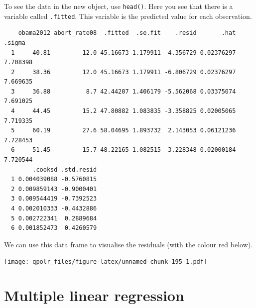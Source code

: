 \documentclass[12pt,oneside]{reedthesis}
\theoremstyle{definition}
\theoremstyle{definition}
\theoremstyle{definition}
\theoremstyle{remark}
\begin{document}
  To see the data in the new object, use \texttt{head()}. Here you see
  that there is a variable called \texttt{.fitted}. This variable is the
  predicted value for each observation.
  \begin{Shaded}
  \begin{Highlighting}[]
  \end{Highlighting}
  \end{Shaded}
  \begin{verbatim}
    obama2012 abort_rate08  .fitted  .se.fit    .resid       .hat   .sigma
  1     40.81         12.0 45.16673 1.179911 -4.356729 0.02376297 7.708398
  2     38.36         12.0 45.16673 1.179911 -6.806729 0.02376297 7.669635
  3     36.88          8.7 42.44207 1.406179 -5.562068 0.03375074 7.691025
  4     44.45         15.2 47.80882 1.083835 -3.358825 0.02005065 7.719335
  5     60.19         27.6 58.04695 1.893732  2.143053 0.06121236 7.728453
  6     51.45         15.7 48.22165 1.082515  3.228348 0.02000184 7.720544
        .cooksd .std.resid
  1 0.004039088 -0.5760815
  2 0.009859143 -0.9000401
  3 0.009544419 -0.7392523
  4 0.002010333 -0.4432886
  5 0.002722341  0.2889684
  6 0.001852473  0.4260579
  \end{verbatim}
  We can use this data frame to visualise the residuals (with the colour
  red below).
  \begin{Shaded}
  \begin{Highlighting}[]
  \NormalTok{(}\OperatorTok{+}
  \StringTok{  }\NormalTok{(}\NormalTok{(}
          \NormalTok{) }\OperatorTok{+}
  \StringTok{  }\NormalTok{() }\OperatorTok{+}
  \StringTok{  }\NormalTok{(}\NormalTok{(}
  \end{Highlighting}
  \end{Shaded}
  \texttt{[image: qpolr\_files/figure-latex/unnamed-chunk-195-1.pdf]}
  
  \section{Multiple linear regression}\label{multiple-linear-regression}
  
\end{document}
